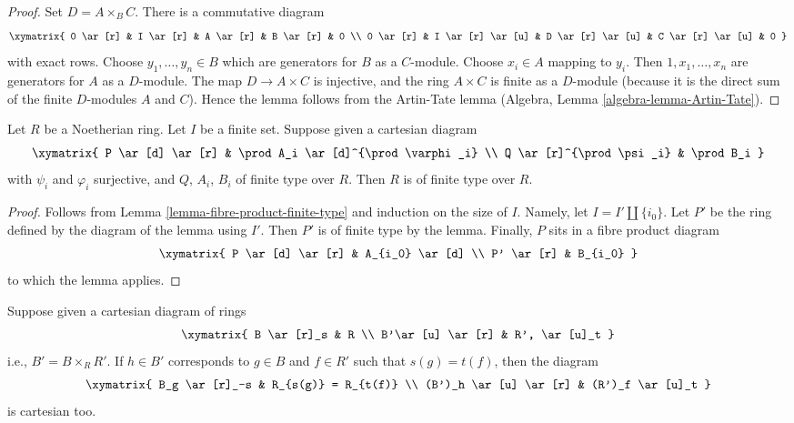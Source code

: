 \begin{proof}
Set $D = A \times_B C$. There is a commutative diagram
$$
\xymatrix{
0 \ar[r] &
I \ar[r] &
A \ar[r] &
B \ar[r] &
0 \\
0 \ar[r] &
I \ar[r] \ar[u] &
D \ar[r] \ar[u] &
C \ar[r] \ar[u] &
0
}
$$
with exact rows. Choose $y_1, \ldots, y_n \in B$ which are generators for
$B$ as a $C$-module. Choose $x_i \in A$ mapping to $y_i$.
Then $1, x_1, \ldots, x_n$ are generators for $A$ as a $D$-module.
The map $D \to A \times C$ is injective, and the ring $A \times C$ is finite
as a $D$-module (because it is the direct sum of the finite $D$-modules
$A$ and $C$). Hence the lemma follows from the Artin-Tate lemma
(Algebra, Lemma \ref{algebra-lemma-Artin-Tate}).
\end{proof}

\begin{lemma}
\label{lemma-formal-consequence}
Let $R$ be a Noetherian ring. Let $I$ be a finite set. Suppose given a
cartesian diagram
$$
\xymatrix{
P \ar[d] \ar[r] & \prod A_i \ar[d]^{\prod \varphi_i} \\
Q \ar[r]^{\prod \psi_i} & \prod B_i
}
$$
with $\psi_i$ and $\varphi_i$ surjective, and $Q$, $A_i$, $B_i$ of
finite type over $R$. Then $R$ is of finite type over $R$.
\end{lemma}

\begin{proof}
Follows from Lemma \ref{lemma-fibre-product-finite-type}
and induction on the size of $I$.
Namely, let $I = I' \amalg \{i_0\}$. Let $P'$ be the ring defined
by the diagram of the lemma using $I'$. Then $P'$ is of finite type
by the lemma. Finally, $P$ sits in a fibre product diagram
$$
\xymatrix{
P \ar[d] \ar[r] & A_{i_0} \ar[d] \\
P' \ar[r] & B_{i_0}
}
$$
to which the lemma applies.
\end{proof}

\begin{lemma}
\label{lemma-diagram-localize}
Suppose given a cartesian diagram of rings
$$
\xymatrix{
B \ar[r]_s & R \\
B'\ar[u] \ar[r] & R', \ar[u]_t
}
$$
i.e., $B' = B \times_R R'$. If $h \in B'$ corresponds to $g \in B$
and $f \in R'$ such that $s(g) = t(f)$, then the diagram
$$
\xymatrix{
B_g \ar[r]_-s & R_{s(g)} = R_{t(f)} \\
(B')_h \ar[u] \ar[r] & (R')_f \ar[u]_t
}
$$
is cartesian too.
\end{lemma}

